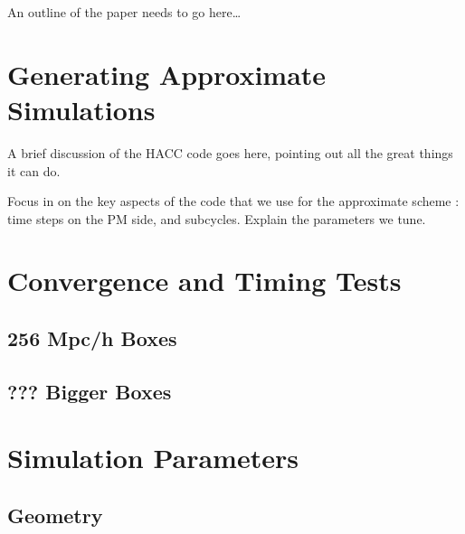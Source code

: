 \documentclass[usenatbib]{mn2e}
\begin{document}
An outline of the paper needs to go here\ldots

\section{Generating Approximate Simulations}

A brief discussion of the HACC code goes here, pointing out all the great things
it can do. 

Focus in on the key aspects of the code that we use for the approximate scheme :
time steps on the PM side, and subcycles. Explain the parameters we tune.


\section{Convergence and Timing Tests}



\subsection{256 Mpc/h Boxes}


\subsection{??? Bigger Boxes}

\section{Simulation Parameters}

\subsection{Geometry}
\end{document}
